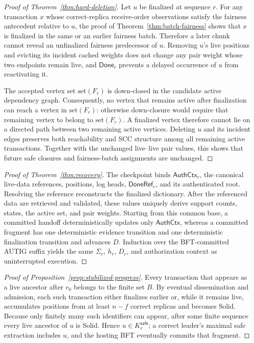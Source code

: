 \begin{proof}[Proof of Theorem~\ref{thm:hard-deletion}]
Let $u$ be finalized at sequence $r$.  For any transaction $x$ whose
correct-replica receive-order observations satisfy the fairness antecedent
relative to $u$, the proof of
Theorem~\ref{thm:batch-fairness} shows that $x$ is finalized in the same or
an earlier fairness batch.  Therefore a later chunk cannot reveal an
unfinalized fairness predecessor of $u$.  Removing $u$'s live positions and
evicting its incident cached weights does not change any pair weight whose two
endpoints remain live, and $\mathsf{Done}_r$ prevents a delayed occurrence of $u$ from
reactivating it.

The accepted vertex set $\mathrm{set}(F_r)$ is down-closed in the candidate
active dependency graph.
Consequently, no vertex that remains active after finalization can reach a
vertex in $\mathrm{set}(F_r)$: otherwise down-closure would require that
remaining vertex to belong to $\mathrm{set}(F_r)$.  A finalized vertex
therefore cannot lie on a directed
path between two remaining active vertices.  Deleting $u$ and its incident
edges preserves both reachability and SCC structure among all remaining
active transactions.  Together with the unchanged live--live pair values,
this shows that future safe closures and fairness-batch assignments are
unchanged.
\end{proof}

\begin{proof}[Proof of Theorem~\ref{thm:recovery}]
The checkpoint binds $\mathsf{AuthCtx}_r$, the canonical live-data references,
positions, log heads, $\mathsf{DoneRef}_r$, and its authenticated root.  Resolving the
reference reconstructs the finalized dictionary.  After the referenced data
are retrieved and validated, these values uniquely derive support counts, states,
the active set, and pair weights.  Starting from this common base, a committed
handoff deterministically updates only $\mathsf{AuthCtx}$, whereas a committed
fragment has one deterministic evidence transition and one deterministic
finalization transition and advances $D$.  Induction over the BFT-committed
AUTIG suffix yields the same $\Sigma_r$, $h_r$, $D_r$, and authorization context
as uninterrupted execution.
\end{proof}

\begin{proof}[Proof of Proposition~\ref{prop:stabilized-progress}]
Every transaction that appears as a live ancestor after $r_0$ belongs to the finite set $B$.  By eventual dissemination and admission, each such transaction either finalizes earlier or, while it remains live, accumulates positions from at least $n-f$ correct replicas and becomes Solid.  Because only finitely many such identifiers can appear, after some finite sequence
every live ancestor of $u$ is Solid.  Hence $u\in K_r^{\mathsf{safe}}$; a correct leader's maximal safe extraction includes $u$, and the hosting BFT eventually commits that fragment.
\end{proof}

